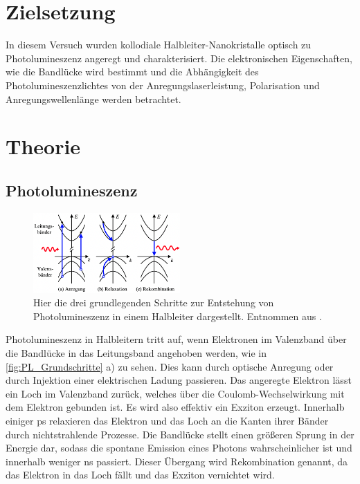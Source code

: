 \section*{Zielsetzung}
In diesem Versuch wurden kollodiale Halbleiter-Nanokristalle optisch zu Photolumineszenz angeregt und charakterisiert. Die elektronischen Eigenschaften, wie die Bandlücke wird bestimmt und die Abhängigkeit des Photolumineszenzlichtes von der Anregungslaserleistung, Polarisation und Anregungswellenlänge werden betrachtet.

\section{Theorie}
\subsection{Photolumineszenz}
    \begin{figure}[ht]
        \centering\captionsetup{format=plain}
        \includegraphics[width=0.5\textwidth]{bilder/PL_Grundschritte.png}
        \caption{Hier die drei grundlegenden Schritte zur Entstehung von Photolumineszenz in einem Halbleiter dargestellt. Entnommen aus \cite{Photolumineszenz}.}
        \label{fig:PL_Grundschritte}
    \end{figure}
    \FloatBarrier
    Photolumineszenz in Halbleitern tritt auf, wenn Elektronen im Valenzband über die Bandlücke in das Leitungsband angehoben werden, wie in \autoref{fig:PL_Grundschritte} a) zu sehen.
    Dies kann durch optische Anregung oder durch Injektion einer elektrischen Ladung passieren.
    Das angeregte Elektron lässt ein Loch im Valenzband zurück, welches über die Coulomb-Wechselwirkung mit dem Elektron gebunden ist.
    Es wird also effektiv ein Exziton erzeugt.
    Innerhalb einiger ps relaxieren das Elektron und das Loch an die Kanten ihrer Bänder durch nichtstrahlende Prozesse.
    Die Bandlücke stellt einen größeren Sprung in der Energie dar, sodass die spontane Emission eines Photons wahrscheinlicher ist und innerhalb weniger ns passiert.
    Dieser Übergang wird Rekombination genannt, da das Elektron in das Loch fällt und das Exziton vernichtet wird.
    
